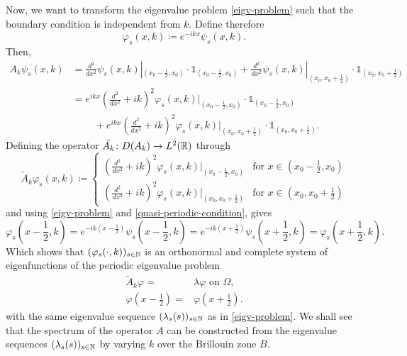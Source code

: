 Now, we want to transform the eigenvalue problem \eqref{eigv-problem} such that the boundary condition is independent from $k$. Define therefore
	\[ \varphi_{s}(x, k) \coloneqq e^{-ikx} \psi_{s}(x, k). \]
Then,
	\begin{align*}
		A_{k} \psi_{s}(x, k) & = \frac{d^{2}}{dx^{2}} \psi_{s}(x, k)|_{(x_{0} - \frac{1}{2}, x_{0})} \cdot \mathds{1}_{(x_{0} - \frac{1}{2}, x_{0})} + \frac{d^{2}}{dx^{2}} \psi_{s}(x, k)|_{(x_{0}, x_{0}  + \frac{1}{2})} \cdot \mathds{1}_{(x_{0}, x_{0} + \frac{1}{2})} \\
				& = e^{ikx} \left( \frac{d^{2}}{dx^{2}} + ik \right)^{2} \varphi_{s}(x, k)|_{(x_{0} - \frac{1}{2}, x_{0})} \cdot \mathds{1}_{(x_{0} - \frac{1}{2}, x_{0})} \\
				& ~\qquad + e^{ikx} \left( \frac{d^{2}}{dx^{2}} + ik \right)^{2} \varphi_{s}(x, k)|_{(x_{0}, x_{0}  + \frac{1}{2})} \cdot \mathds{1}_{(x_{0}, x_{0} + \frac{1}{2})}.
	\end{align*}
Defining the operator $\tilde{A_{k}} \colon D(A_{k}) \rightarrow L^{2}(\mathbb{R})$ through 
	\[ \tilde{A}_{k} \varphi_{s}(x, k) \coloneqq \begin{cases}
 		\left( \frac{d^{2}}{dx^{2}} + ik \right)^{2} \varphi_{s}(x, k)|_{(x_{0} - \frac{1}{2}, x_{0})} & \text{for } x \in (x_{0} - \frac{1}{2}, x_{0}) \\ \left( \frac{d^{2}}{dx^{2}} + ik \right)^{2} \varphi_{s}(x, k)|_{(x_{0}, x_{0}  + \frac{1}{2})} & \text{for } x \in (x_{0}, x_{0} + \frac{1}{2})
 	\end{cases} \] 
and using \eqref{eigv-problem} and \eqref{quasi-periodic-condition}, gives
		\[ \varphi_{s}(x - \frac{1}{2}, k) = e^{-ik(x - \frac{1}{2})} \psi_{s}(x - \frac{1}{2}, k) = e^{-ik(x + \frac{1}{2})} \psi_{s}(x + \frac{1}{2}, k) = \varphi_{s}(x + \frac{1}{2}, k). \]
Which shows that $(\varphi_{s}(\cdot, k))_{s \in \mathbb{N}}$ is an orthonormal and complete system of eigenfunctions of the periodic eigenvalue problem
	\begin{eqnarray}
		\tilde{A}_{k} \varphi = & \lambda
		 \varphi \text{ on } \Omega, \label{mod-eigv-problem} \\
		 \varphi(x - \frac{1}{2}) = & \varphi(x + \frac{1}{2}). \label{periodic-condition}
	\end{eqnarray}
with the same eigenvalue sequence $(\lambda_{s}(s))_{s \in \mathbb{N}}$ as in \eqref{eigv-problem}. We shall see that the spectrum of the operator $A$ can be constructed from the eigenvalue sequences $(\lambda_{s}(s))_{s \in \mathbb{N}}$ by varying $k$ over the Brillouin zone $B$.\\
	
